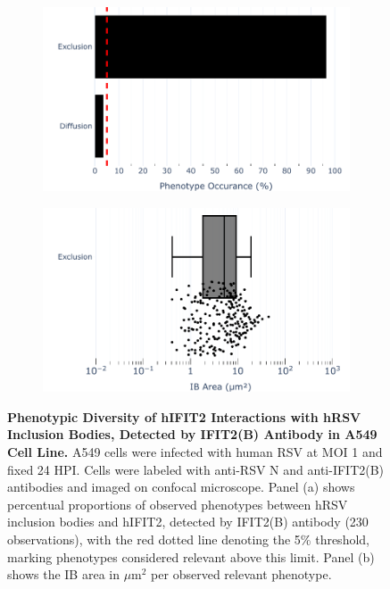 \begin{figure}
    \begin{subfigure}{0.495\textwidth}
        \caption{}
        \includegraphics[width=1\linewidth]{08. Chapter 3/Figs/02. Infection/02. IFIT2/02. IFIT2B/01. bar_i2b_a549.pdf}
    \end{subfigure}
    \begin{subfigure}{0.495\textwidth}
        \caption{}
        \includegraphics[width=1\linewidth]{08. Chapter 3/Figs/02. Infection/02. IFIT2/02. IFIT2B/02. box_i2b_a549.pdf}
    \end{subfigure}
    \caption[Phenotypic Diversity of hIFIT2 Interactions with hRSV Inclusion Bodies, Detected by IFIT2(B) Antibody in A549 Cell Line.]{\textbf{Phenotypic Diversity of hIFIT2 Interactions with hRSV Inclusion Bodies, Detected by IFIT2(B) Antibody in A549 Cell Line.} A549 cells were infected with human RSV at MOI 1 and fixed 24 HPI. Cells were labeled with anti-RSV N and anti-IFIT2(B) antibodies and imaged on confocal microscope. Panel (a) shows percentual proportions of observed phenotypes between hRSV inclusion bodies and hIFIT2, detected by IFIT2(B) antibody (230 observations), with the red dotted line denoting the 5\% threshold, marking phenotypes considered relevant above this limit. Panel (b) shows the IB area in \(\mu \mbox{m}^2\) per observed relevant phenotype.}
    \label{fig:Phenotypic Diversity of hIFIT2 Interactions with hRSV Inclusion Bodies, Detected by IFIT2(B) Antibody in A549 Cell Line}
\end{figure}

